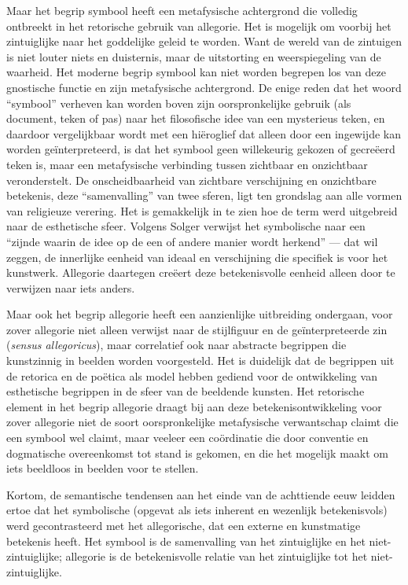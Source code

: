 Maar het begrip symbool heeft een metafysische achtergrond die volledig ontbreekt in het retorische gebruik van allegorie. Het is mogelijk om voorbij het zintuiglijke naar het goddelijke geleid te worden. Want de wereld van de zintuigen is niet louter niets en duisternis, maar de uitstorting en weerspiegeling van de waarheid. Het moderne begrip symbool kan niet worden begrepen los van deze gnostische functie en zijn metafysische achtergrond. De enige reden dat het woord ``symbool'' verheven kan worden boven zijn oorspronkelijke gebruik (als document, teken of pas) naar het filosofische idee van een mysterieus teken, en daardoor vergelijkbaar wordt met een hiëroglief dat alleen door een ingewijde kan worden geïnterpreteerd, is dat het symbool geen willekeurig gekozen of gecreëerd teken is, maar een metafysische verbinding tussen zichtbaar en onzichtbaar veronderstelt. De onscheidbaarheid van zichtbare verschijning en onzichtbare betekenis, deze ``samenvalling'' van twee sferen, ligt ten grondslag aan alle vormen van religieuze verering. Het is gemakkelijk in te zien hoe de term werd uitgebreid naar de esthetische sfeer. Volgens Solger verwijst het symbolische naar een ``zijnde waarin de idee op de een of andere manier wordt herkend'' — dat wil zeggen, de innerlijke eenheid van ideaal en verschijning die specifiek is voor het kunstwerk. Allegorie daartegen creëert deze betekenisvolle eenheid alleen door te verwijzen naar iets anders.

Maar ook het begrip allegorie heeft een aanzienlijke uitbreiding ondergaan, voor zover allegorie niet alleen verwijst naar de stijlfiguur en de geïnterpreteerde zin (\textit{sensus allegoricus}), maar correlatief ook naar abstracte begrippen die kunstzinnig in beelden worden voorgesteld. Het is duidelijk dat de begrippen uit de retorica en de poëtica als model hebben gediend voor de ontwikkeling van esthetische begrippen in de sfeer van de beeldende kunsten. Het retorische element in het begrip allegorie draagt bij aan deze betekenisontwikkeling voor zover allegorie niet de soort oorspronkelijke metafysische verwantschap claimt die een symbool wel claimt, maar veeleer een coördinatie die door conventie en dogmatische overeenkomst tot stand is gekomen, en die het mogelijk maakt om iets beeldloos in beelden voor te stellen.

Kortom, de semantische tendensen aan het einde van de achttiende eeuw leidden ertoe dat het symbolische (opgevat als iets inherent en wezenlijk betekenisvols) werd gecontrasteerd met het allegorische, dat een externe en kunstmatige betekenis heeft. Het symbool is de samenvalling van het zintuiglijke en het niet-zintuiglijke; allegorie is de betekenisvolle relatie van het zintuiglijke tot het niet-zintuiglijke.

